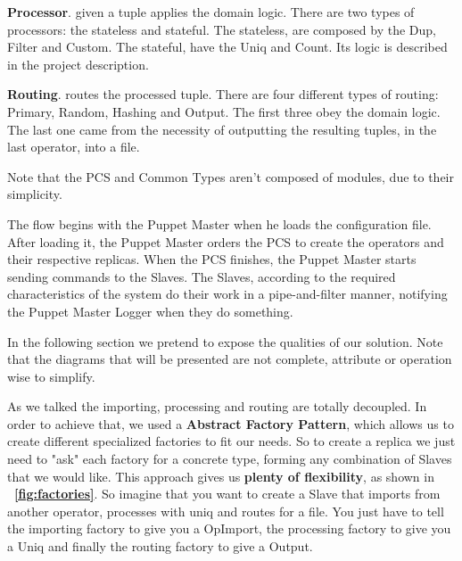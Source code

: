\documentclass[times, 10pt,twocolumn]{article}
\begin{document}
\textbf{Processor}. given a tuple applies the domain logic. There are two types of processors: the stateless and stateful. The stateless, are composed by the Dup, Filter and Custom. The stateful, have the Uniq and Count. Its logic is described in the project description.

\textbf{Routing}. routes the processed tuple. There are four different types of routing: Primary, Random, Hashing and Output. The first three obey the domain logic. The last one came from the necessity of outputting the resulting tuples, in the last operator, into a file. 

Note that the PCS and Common Types aren't composed of modules, due to their simplicity.



The flow begins with the Puppet Master when he loads the configuration file. After loading it, the Puppet Master orders the PCS to create the operators and their respective replicas. When the PCS finishes, the Puppet Master starts sending commands to the Slaves. The Slaves, according to the required characteristics of the system do their work in a pipe-and-filter manner, notifying the Puppet Master Logger when they do something.



In the following section we pretend to expose the qualities of our solution. Note that the diagrams that will be presented are not complete, attribute or operation wise to simplify.

As we talked the importing, processing and routing are totally decoupled. In order to achieve that, we used a \textbf{Abstract Factory Pattern}, which allows us to create different specialized factories to fit our needs. So to create a replica we just need to "ask" each factory for a concrete type, forming any combination of Slaves that we would like. This approach gives us \textbf{plenty of flexibility}, as shown in \textbf{~\cref{fig:factories}}. So imagine that you want to create a Slave that imports from another operator, processes with uniq and routes for a file. You just have to tell the importing factory to give you a OpImport, the processing factory to give you a Uniq and finally the routing factory to give a Output.
\end{document}
